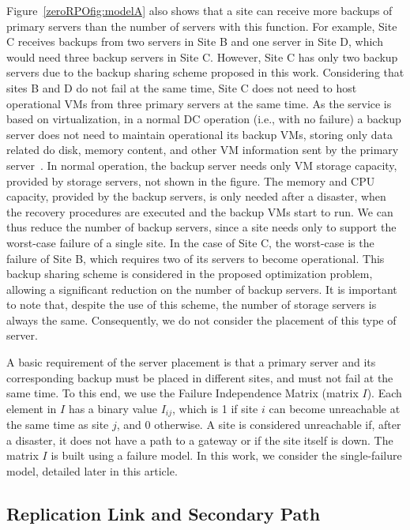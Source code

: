 \documentclass[preprint]{elsarticle}
\begin{document}
Figure~\ref{zeroRPOfig:modelA} also shows that a site can receive more backups of primary servers than the number of servers with this function. For example, Site C receives backups from two servers in Site B and one server in Site D, which would need three backup servers in Site C. However, Site C has only two backup servers due to the backup sharing scheme proposed in this work. 
Considering that sites B and D do not fail at the same time, Site C does not need to host operational VMs from three primary servers at the same time. As the service is based on virtualization, in a normal DC operation (i.e., with no failure) a backup server does not need to maintain operational its backup VMs, storing only data related do disk, memory content, and other VM information sent by the primary server~\cite{couto2014Network,wood2010disaster}. In normal operation, the backup server needs only VM storage capacity, provided by storage servers, not shown in the figure. The memory and CPU capacity, provided by the backup servers, is only needed after a disaster, when the recovery procedures are executed and the backup VMs start to run. We can thus reduce the number of backup servers, since a site needs only to support the worst-case failure of a single site.
In the case of Site C, the worst-case is the failure of Site B, which requires two of its servers to become operational.
This backup sharing scheme is considered in the proposed optimization problem, allowing a significant reduction on the number of backup servers. It is important to note that, despite the use of this scheme, the number of storage servers is always the same. Consequently, we do not consider the placement of this type of server.

A basic requirement of the server placement is that a primary server and its corresponding backup must be placed in different sites, and must not fail at the same time. To this end, we use the Failure Independence Matrix (matrix $I$).
Each element in $I$ has a binary value $I_{ij}$, which is 1 if site $i$ can become unreachable at the same time as site $j$, and 0 otherwise. A site is considered unreachable if, after a disaster, it does not have a path to a gateway or if the site itself is down. The matrix $I$ is built using a failure model. In this work, we consider the single-failure model, detailed later in this article.

\subsection{Replication Link and Secondary Path}
\end{document}
